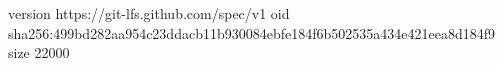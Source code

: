 version https://git-lfs.github.com/spec/v1
oid sha256:499bd282aa954c23ddacb11b930084ebfe184f6b502535a434e421eea8d184f9
size 22000
